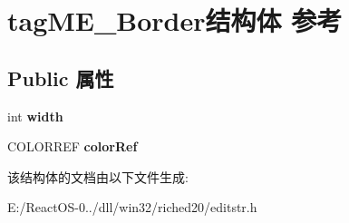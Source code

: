 \hypertarget{structtag_m_e___border}{}\section{tag\+M\+E\+\_\+\+Border结构体 参考}
\label{structtag_m_e___border}
\subsection*{Public 属性}
\begin{DoxyCompactItemize}
\item 
\mbox{\label{structtag_m_e___border_a0c37e441ab1f42c54a08ee71f6fcc6ab}} 
int {\bfseries width}
\item 
\mbox{\label{structtag_m_e___border_a36e5bd0c175d34e8feddd461e29ecefc}} 
C\+O\+L\+O\+R\+R\+EF {\bfseries color\+Ref}
\end{DoxyCompactItemize}


该结构体的文档由以下文件生成\+:\begin{DoxyCompactItemize}
\item 
E\+:/\+React\+O\+S-\/0../dll/win32/riched20/editstr.\+h\end{DoxyCompactItemize}
